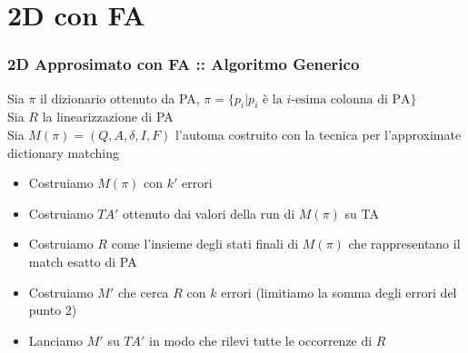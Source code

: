 \documentclass{beamer}
\begin{document}
\section{2D con FA}
\begin{frame}
\frametitle{2D Approsimato con FA :: Algoritmo Generico}
\begin{definition}
	Sia $\pi$ il dizionario ottenuto da PA, $\pi= \{p_i | p_i \text{ è la } i \text{-esima colonna di PA}\}$\\
	Sia $R$ la linearizzazione di PA\\
	Sia $M(\pi) = (Q,A,\delta,I,F)$ l'automa costruito con la tecnica per l'approximate dictionary matching\\
\end{definition}
\begin{itemize}
\item Costruiamo $M(\pi)$ con $k'$ errori 
\item Costruiamo $TA'$ ottenuto dai valori della run di $M(\pi)$ su TA
\item Costruiamo $R$ come l'insieme degli stati finali di $M(\pi)$ che rappresentano il match esatto di PA
\item Costruiamo $M'$ che cerca $R$ con $k$ errori (limitiamo la somma degli errori del punto 2)
\item Lanciamo $M'$ su $TA'$ in modo che rilevi tutte le occorrenze di $R$
\end{itemize}

\end{frame}
\end{document}
